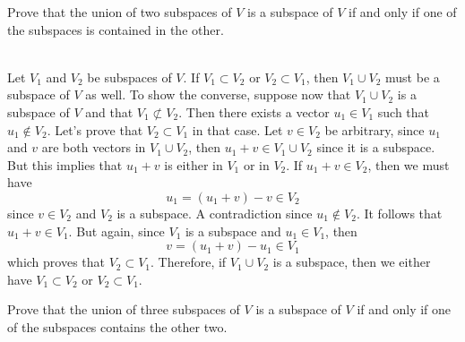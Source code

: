 \begin{exercise}
    Prove that the union of two subspaces of $V$ is a subspace of $V$ if and only if one of the subspaces is contained in the other. \\
\end{exercise}

\begin{solution}
    \\ Let $V_1$ and $V_2$ be subspaces of $V$. If $V_1 \subset V_2$ or $V_2 \subset V_1$, then $V_1 \cup V_2$ must be a subspace of $V$ as well. To show the converse, suppose now that $V_1 \cup V_2$ is a subspace of $V$ and that $V_1 \not\subset V_2$. Then there exists a vector $u_1 \in V_1$ such that $u_1 \notin V_2$. Let's prove that $V_2 \subset V_1$ in that case. Let $v \in V_2$ be arbitrary, since $u_1$ and $v$ are both vectors in $V_1 \cup V_2$, then $u_1 + v \in V_1 \cup V_2$ since it is a subspace. But this implies that $u_1 + v$ is either in $V_1$ or in $V_2$. If $u_1 + v \in V_2$, then we must have
    $$u_1 = (u_1 + v) - v \in V_2$$
    since $v \in V_2$ and $V_2$ is a subspace. A contradiction since $u_1 \notin V_2$. It follows that $u_1 + v \in V_1$. But again, since $V_1$ is a subspace and $u_1 \in V_1$, then
    $$v = (u_1 + v) - u_1 \in V_1$$
    which proves that $V_2 \subset V_1$. Therefore, if $V_1 \cup V_2$ is a subspace, then we either have $V_1 \subset V_2$ or $V_2 \subset V_1$. \\
\end{solution}

\begin{exercise}
    Prove that the union of three subspaces of $V$ is a subspace of $V$ if and only if one of the subspaces contains the other two. \\
\end{exercise}

